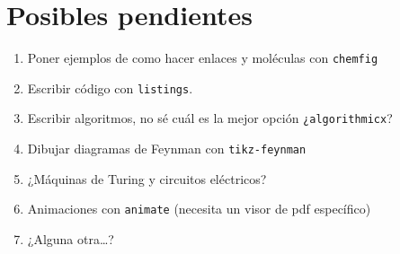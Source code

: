 \section{Posibles pendientes}
\begin{enumerate}
  \item Poner ejemplos de como hacer enlaces y moléculas con
  \texttt{chemfig}
  \item Escribir código con \texttt{listings}.
  \item Escribir algoritmos, no sé cuál es la mejor opción
  \texttt{¿algorithmicx}?
  \item Dibujar diagramas de Feynman con \texttt{tikz-feynman}
  \item ¿Máquinas de Turing y circuitos eléctricos?
  \item Animaciones con \texttt{animate} (necesita un visor de pdf específico)
  \item ¿Alguna otra\ldots?
\end{enumerate}
